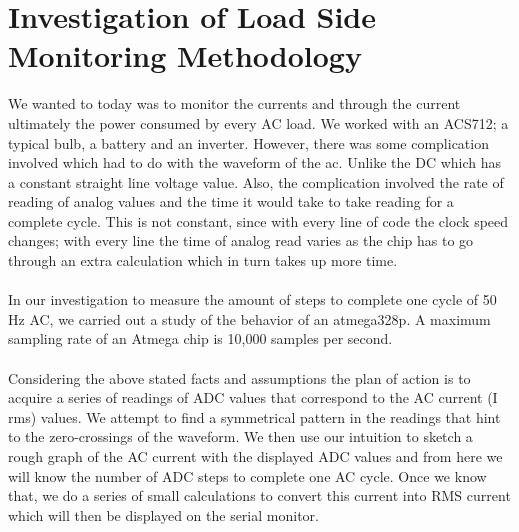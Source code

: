 \documentclass{article}
\begin{document}
\section{Investigation of Load Side Monitoring Methodology}
\begin{multicols}{2}

We wanted to today was to monitor the currents and through the current ultimately the power consumed by every AC load. We worked with an ACS712; a typical bulb, a battery and an inverter. However, there was some complication involved which had to do with the waveform of the ac. Unlike the DC which has a constant straight line voltage value. Also, the complication involved the rate of reading of analog values and the time it would take to take reading for a complete cycle. This is not constant, since with every line of code the clock speed changes; with every line the time of analog read varies as the chip has to go through an extra calculation which in turn takes up more time.

\paragraph{} In our investigation to measure the amount of steps to complete one cycle of 50 Hz AC, we carried out a study of the behavior of an atmega328p. A maximum sampling rate of an Atmega chip is 10,000 samples per second.\cite{arduinosamplerate}

\paragraph{} Considering the above stated facts and assumptions the plan of action is to acquire a series of readings of ADC values that correspond to the AC current (I rms) values. We attempt to find a symmetrical pattern in the readings that hint to the zero-crossings of the waveform. We then use our intuition to sketch a rough graph of the AC current with the displayed ADC values and from here we will know the number of ADC steps to complete one AC cycle. Once we know that, we do a series of small calculations to convert this current into RMS current which will then be displayed on the serial monitor. 


\end{multicols}








\end{document}
